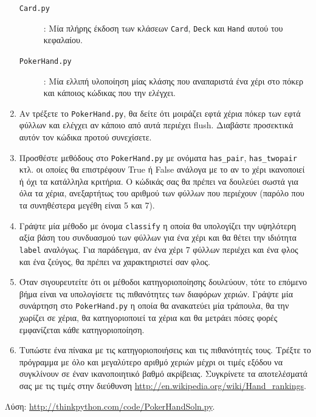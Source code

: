 \documentclass[10pt]{book}
\begin{document}
\begin{exercise}
\begin{enumerate}
\begin{description}

\item[{\tt Card.py}]:  Μία πλήρης έκδοση των κλάσεων  {\tt Card}, {\tt Deck}  
και  {\tt Hand}  αυτού του κεφαλαίου. 

\item[{\tt PokerHand.py}]:  Μία ελλιπή υλοποίηση μίας κλάσης που αναπαριστά ένα χέρι 
στο πόκερ και κάποιος κώδικας που την ελέγχει. 

\end{description}
%
 
\item Αν τρέξετε το {\tt PokerHand.py}, θα δείτε ότι μοιράζει εφτά χέρια πόκερ των
εφτά φύλλων και ελέγχει αν κάποιο από αυτά περιέχει flush. Διαβάστε προσεκτικά αυτόν τον κώδικα
προτού συνεχίσετε.

\item Προσθέστε μεθόδους στο {\tt PokerHand.py} με ονόματα \verb"has_pair", 
\verb"has_twopair" κτλ. οι οποίες θα επιστρέφουν True ή False ανάλογα 
με το αν το χέρι ικανοποιεί ή όχι τα κατάλληλα κριτήρια. Ο κώδικάς σας θα πρέπει
να δουλεύει σωστά για όλα τα χέρια, ανεξαρτήτως του αριθμού των φύλλων που περιέχουν
(παρόλο που τα συνηθέστερα μεγέθη είναι 5 και 7).

\item Γράψτε μία μέθοδο με όνομα {\tt classify} η οποία θα υπολογίζει
την υψηλότερη αξία βάση του συνδυασμού των φύλλων για ένα χέρι και θα θέτει την ιδιότητα
{\tt label} αναλόγως. Για παράδειγμα, αν ένα χέρι 7 φύλλων περιέχει και ένα 
φλος και ένα ζεύγος, θα πρέπει να χαρακτηριστεί σαν φλος.

\item Όταν σιγουρευτείτε ότι οι μέθοδοι κατηγοριοποίησης δουλεύουν, τότε το επόμενο βήμα 
είναι να υπολογίσετε τις πιθανότητες των διαφόρων χεριών.  Γράψτε μία συνάρτηση στο
{\tt PokerHand.py} η οποία θα ανακατεύει μία τράπουλα, θα την χωρίζει σε χέρια, 
θα κατηγοριοποιεί τα χέρια και θα μετράει πόσες φορές εμφανίζεται κάθε κατηγοριοποίηση.

\item Τυπώστε ένα πίνακα με τις κατηγοριοποιήσεις και τις πιθανότητές τους.  Τρέξτε το 
πρόγραμμα με όλο και μεγαλύτερο αριθμό χεριών μέχρι οι τιμές εξόδου να συγκλίνουν σε έναν 
ικανοποιητικό βαθμό ακρίβειας.  Συγκρίνετε τα αποτελέσματά σας με τις τιμές στην διεύθυνση
\url{http://en.wikipedia.org/wiki/Hand_rankings}. 

\end{enumerate}

Λύση: \url{http://thinkpython.com/code/PokerHandSoln.py}. 

\end{exercise}
\end{document}
